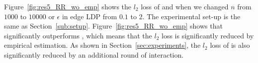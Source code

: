 
Figure~\ref{fig:res5_RR_wo_emp} shows the $l_2$ loss of  and  when we changed $n$ from $1000$ to $10000$ or $\epsilon$ in edge LDP from $0.1$ to $2$. 
The experimental set-up is the same as Section~\ref{sub:setup}. 
Figure~\ref{fig:res5_RR_wo_emp} shows that  significantly outperforms , which means that the $l_2$ loss is significantly reduced by empirical estimation. 
As shown in Section~\ref{sec:experiments}, the $l_2$ loss of  is also significantly reduced by an additional round of interaction.

